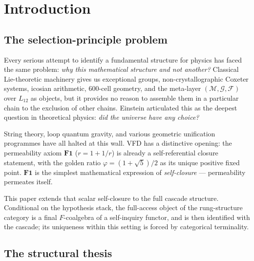 \documentclass[11pt, a4paper]{amsart}
\theoremstyle{definition}
\newcommand{\Fcal}{\mathcal{F}}
\newcommand{\Mcal}{\mathcal{M}}
\newcommand{\Gcal}{\mathcal{G}}
\begin{document}
\begin{abstract}
\textbf{Status:} Theorem skeleton with conditional structure.
Each headline theorem carries an explicit hypothesis list. The
hypothesis stack is the precise object of continuing programme
work, listed in Section~\ref{sec:open}.
\end{abstract}

\tableofcontents

\section{Introduction}
\label{sec:intro}

\subsection{The selection-principle problem}

Every serious attempt to identify a fundamental structure for
physics has faced the same problem: \emph{why this mathematical
structure and not another?} Classical Lie-theoretic machinery
gives us exceptional groups, non-crystallographic Coxeter systems,
icosian arithmetic, $600$-cell geometry, and the meta-layer
$(\Mcal, \Gcal, \Fcal)$ over $L_{12}$ as objects, but it provides
no reason to assemble them in a particular chain to the exclusion
of other chains. Einstein articulated this as the deepest question
in theoretical physics: \emph{did the universe have any choice?}

String theory, loop quantum gravity, and various geometric
unification programmes have all halted at this wall. VFD has a
distinctive opening: the permeability axiom $\mathbf{F1}$
($r = 1 + 1/r$) is already a self-referential closure statement,
with the golden ratio $\varphi = (1+\sqrt{5})/2$ as its unique
positive fixed point. $\mathbf{F1}$ is the simplest mathematical
expression of \emph{self-closure} — permeability permeates itself.

This paper extends that scalar self-closure to the full cascade
structure. Conditional on the hypothesis stack, the full-access
object of the rung-structure category is a final $F$-coalgebra
of a self-inquiry functor, and is then identified with the
cascade; its uniqueness within this setting is forced by
categorical terminality.

\subsection{The structural thesis}
\end{document}
